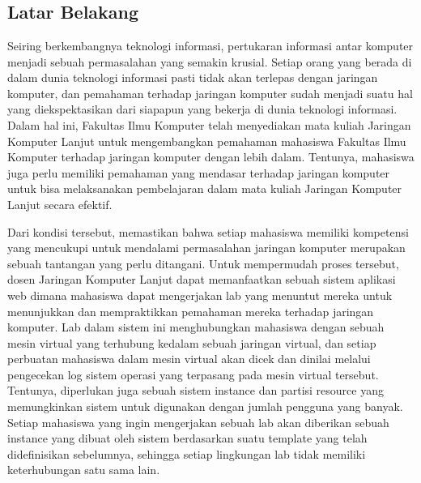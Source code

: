 \chapter{\babSatu}
\label{bab:1}


\section{Latar Belakang}
\label{sec:latarBelakang}
Seiring berkembangnya teknologi informasi, pertukaran informasi antar komputer menjadi sebuah permasalahan yang semakin krusial. 
Setiap orang yang berada di dalam dunia teknologi informasi pasti tidak akan terlepas dengan jaringan komputer, dan pemahaman 
terhadap jaringan komputer sudah menjadi suatu hal yang diekspektasikan dari siapapun yang bekerja di dunia teknologi informasi. 
Dalam hal ini, Fakultas Ilmu Komputer telah menyediakan mata kuliah Jaringan Komputer Lanjut untuk mengembangkan pemahaman mahasiswa 
Fakultas Ilmu Komputer terhadap jaringan komputer dengan lebih dalam. Tentunya, mahasiswa juga perlu memiliki pemahaman yang mendasar 
terhadap jaringan komputer untuk bisa melaksanakan pembelajaran dalam mata kuliah Jaringan Komputer Lanjut secara efektif. \par

Dari kondisi tersebut, memastikan bahwa setiap mahasiswa memiliki kompetensi yang mencukupi untuk mendalami permasalahan jaringan komputer 
merupakan sebuah tantangan yang perlu ditangani. Untuk mempermudah proses tersebut, dosen Jaringan Komputer Lanjut dapat memanfaatkan sebuah 
sistem aplikasi web dimana mahasiswa dapat mengerjakan lab yang menuntut mereka untuk menunjukkan dan mempraktikkan pemahaman mereka 
terhadap jaringan komputer. Lab dalam sistem ini menghubungkan mahasiswa dengan sebuah mesin virtual yang terhubung kedalam sebuah jaringan 
virtual, dan setiap perbuatan mahasiswa dalam mesin virtual akan dicek dan dinilai melalui pengecekan log sistem operasi yang terpasang pada 
mesin virtual tersebut. 
Tentunya, diperlukan juga sebuah sistem instance dan partisi resource yang memungkinkan sistem untuk digunakan dengan jumlah pengguna yang banyak.
Setiap mahasiswa yang ingin mengerjakan sebuah lab akan diberikan sebuah instance yang dibuat oleh sistem berdasarkan suatu template yang telah didefinisikan sebelumnya, 
sehingga setiap lingkungan lab tidak memiliki keterhubungan satu sama lain.
\par

